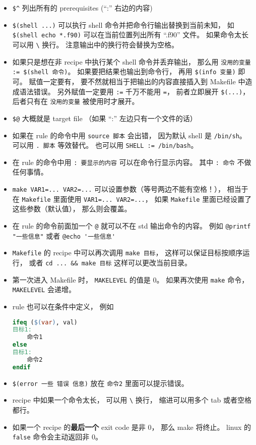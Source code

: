 \begin{itemize}
\item \verb|$^| 列出所有的 prerequisites (“:” 右边的内容)
\item \verb|$(shell ...)| 可以执行 shell 命令并把命令行输出替换到当前未知， 如 \verb|$(shell echo *.f90)| 可以在当前位置列出所有 “.f90” 文件。 如果命令太长可以用 \verb|\| 换行。 注意输出中的换行符会替换为空格。
\item 如果只是想在非 recipe 中执行某个 shell 命令并丢弃输出， 那么用 \verb|没用的变量 := $(shell 命令)|。  如果要把结果也输出到命令行， 再用 \verb|$(info 变量)| 即可。 赋值一定要有， 要不然就相当于把输出的内容直接插入到 Makefile 中造成语法错误。 另外赋值一定要用 \verb|:=| 千万不能用 \verb|=|， 前者立即展开 \verb|$(...)|， 后者只有在 \verb|没用的变量| 被使用时才展开。
\item \verb|$@| 大概就是 target file （如果 “:” 左边只有一个文件的话）
\item 如果在 rule 的命令中用 \verb|source 脚本| 会出错， 因为默认 shell 是 \verb|/bin/sh|。 可以用 \verb|. 脚本| 等效替代。 也可以用 \verb|SHELL := /bin/bash|。
\item 在 rule 的命令中用 \verb|: 要显示的内容| 可以在命令行显示内容。 其中 \verb|: 命令| 不做任何事情。
\item \verb|make VAR1=... VAR2=...| 可以设置参数（等号两边不能有空格！）， 相当于在 \verb|Makefile| 里面使用 \verb|VAR1=... VAR2=...|， 如果 \verb|Makefile| 里面已经设置了这些参数（默认值）， 那么则会覆盖。 
\item 在 rule 的命令前面加一个 \verb|@| 就可以不在 std 输出命令的内容。 例如 \verb|@printf "一些信息"| 或者 \verb|@echo '一些信息'|
\item \verb|Makefile| 的 recipe 中可以再次调用 \verb|make 目标|， 这样可以保证目标按顺序运行， 或者 \verb|cd ... && make 目标| 这样可以更改当前目录。
\item 第一次进入 Makefile 时， \verb|MAKELEVEL| 的值是 0。 如果再次使用 \verb|make| 命令， \verb|MAKELEVEL| 会递增。
\item rule 也可以在条件中定义， 例如
\begin{lstlisting}[language=makefile]
ifeq ($(var), val)
目标1:
	命令1
else
目标1:
	命令2
endif
\end{lstlisting}
\item \verb|$(error 一些 错误 信息)| 放在 \verb|命令2| 里面可以提示错误。
\item recipe 中如果一个命令太长， 可以用 \verb|\| 换行， 缩进可以用多个 tab 或者空格都行。
\item 如果一个 recipe 的\textbf{最后一个} exit code 是非 0， 那么 make 将终止。 linux 的 \verb|false| 命令会主动返回非 0。
\end{itemize}

